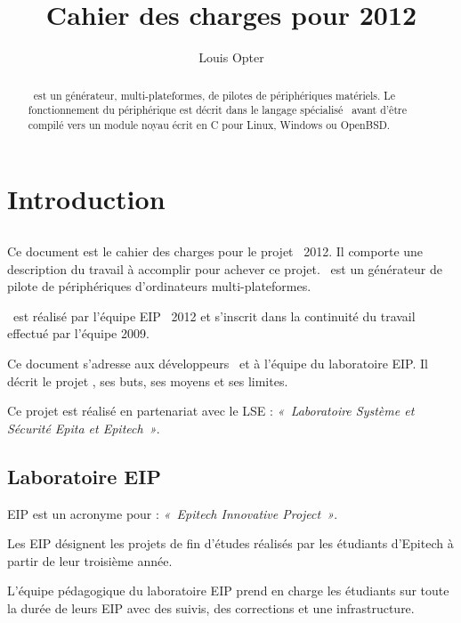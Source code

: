 \documentclass[chapterprefix=off]{rtxreport}
\author{Louis Opter}
\title{Cahier des charges pour 2012}
\begin{document}
\maketitle

\begin{abstract}
\rtx\ est un générateur, multi-plateformes, de pilotes de périphériques
matériels. Le fonctionnement du périphérique est décrit dans le langage
spécialisé \rtx\ avant d'être compilé vers un module noyau écrit en C pour
Linux, Windows ou OpenBSD.
\end{abstract}

\rtxmaketitleblock

\tableofcontents

\chapter{Introduction}

\section{\rtx}


Ce document est le cahier des charges pour le projet \rtx\  2012. Il comporte
une description du travail à accomplir pour achever ce projet. \rtx\  est un
générateur de pilote de périphériques d'ordinateurs multi-plateformes.

\rtx\ est réalisé par l'équipe EIP \rtx\ 2012 et s'inscrit dans la continuité
du travail effectué par l'équipe 2009.

Ce document s'adresse aux développeurs \rtx\  et à l'équipe du laboratoire EIP.
Il décrit le projet \rtx, ses buts, ses moyens et ses limites.

Ce projet est réalisé en partenariat avec le LSE : \emph{«~Laboratoire Système et
Sécurité Epita et Epitech~»}.

\section{Laboratoire EIP}


EIP est un acronyme pour : \emph{«~Epitech Innovative Project~»}.

Les EIP désignent les projets de fin d'études réalisés par les étudiants
d'Epitech à partir de leur troisième année.

L'équipe pédagogique du laboratoire EIP prend en charge les étudiants sur toute
la durée de leurs EIP avec des suivis, des corrections et une infrastructure.
\end{document}
